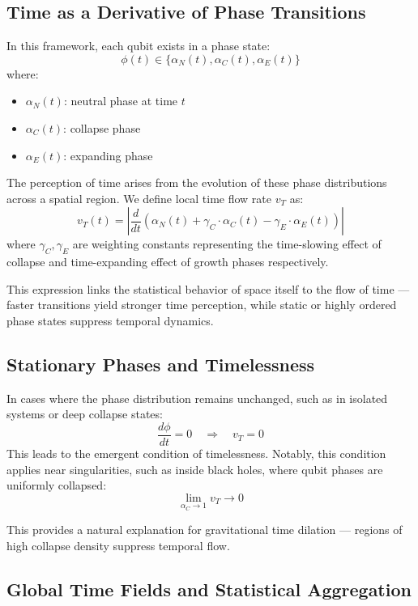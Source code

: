 \documentclass[12pt]{report} %
\begin{document}
\subsection{Time as a Derivative of Phase Transitions}

In this framework, each qubit exists in a phase state:
\[
\phi(t) \in \{ \alpha_N(t), \alpha_C(t), \alpha_E(t) \}
\]
where:
\begin{itemize}
  \item \( \alpha_N(t) \): neutral phase at time \( t \)
  \item \( \alpha_C(t) \): collapse phase
  \item \( \alpha_E(t) \): expanding phase
\end{itemize}

The perception of time arises from the evolution of these phase distributions across a spatial region. We define local time flow rate \( v_T \) as:
\[
v_T(t) = \left| \frac{d}{dt} \left( \alpha_N(t) + \gamma_C \cdot \alpha_C(t) - \gamma_E \cdot \alpha_E(t) \right) \right|
\]
where \( \gamma_C, \gamma_E \) are weighting constants representing the time-slowing effect of collapse and time-expanding effect of growth phases respectively.

This expression links the statistical behavior of space itself to the flow of time — faster transitions yield stronger time perception, while static or highly ordered phase states suppress temporal dynamics.

\subsection{Stationary Phases and Timelessness}

In cases where the phase distribution remains unchanged, such as in isolated systems or deep collapse states:
\[
\frac{d\phi}{dt} = 0 \quad \Rightarrow \quad v_T = 0
\]
This leads to the emergent condition of timelessness. Notably, this condition applies near singularities, such as inside black holes, where qubit phases are uniformly collapsed:
\[
\lim_{\alpha_C \to 1} v_T \to 0
\]

This provides a natural explanation for gravitational time dilation — regions of high collapse density suppress temporal flow.

\subsection{Global Time Fields and Statistical Aggregation}
\end{document}
